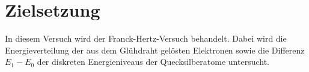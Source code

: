 \section{Zielsetzung}

In diesem Versuch wird der Franck-Hertz-Versuch behandelt.
Dabei wird die Energieverteilung der aus dem Glühdraht gelösten Elektronen
sowie die Differenz $E_1 - E_0$ der diskreten Energieniveaus der Quecksilberatome untersucht.